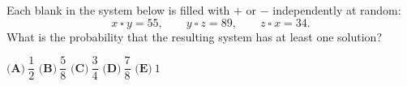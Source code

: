 Each blank in the system below is filled with $+$ or $-$ independently at random:
\[x\ \square\ y=55,\qquad y\ \square\ z=89,\qquad z\ \square\ x=34.\]
What is the probability that the resulting system has at least one solution?

$\textbf{(A)}\ \dfrac12$ \qquad $\textbf{(B)}\ \dfrac58$ \qquad $\textbf{(C)}\ \dfrac34$ \qquad $\textbf{(D)}\ \dfrac78$ \qquad $\textbf{(E)}\ 1$
